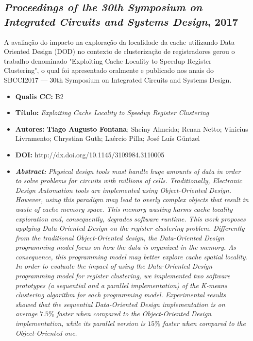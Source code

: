 \subsection{\textit{Proceedings of the 30th Symposium on Integrated Circuits and Systems Design}, 2017}

A avaliação do impacto na exploração da localidade da cache utilizando Data-Oriented Design (DOD) no contexto de clusterização de registradores gerou o trabalho denominado "Exploiting Cache Locality to Speedup Register Clustering", o qual foi apresentado oralmente e publicado nos anais do SBCCI2017 --- 30th Symposium on Integrated Circuits and Systems Design.

\begin{itemize}
\item \textbf{Qualis CC:} B2
\item \textbf{Título:} \textit{Exploiting Cache Locality to Speedup Register Clustering}
\item \textbf{Autores:}  \textbf{Tiago Augusto Fontana}; Sheiny Almeida; Renan Netto; Vinicius Livramento; Chrystian Guth;  Laércio Pilla; José Luís Güntzel
\item \textbf{DOI:} http://dx.doi.org/10.1145/3109984.3110005
\item \textbf{\textit{Abstract:}} \emph{Physical design tools must handle huge amounts of data in order to solve problems for circuits with millions of cells. Traditionally, Electronic Design Automation tools are implemented using Object-Oriented Design. However, using this paradigm may lead to overly complex objects that result in waste of cache memory space. This memory wasting harms cache locality exploration and, consequently, degrades software runtime. This work proposes applying Data-Oriented Design on the register clustering problem. Differently from the traditional Object-Oriented design, the Data-Oriented Design programming model focus on how the data is organized in the memory. As consequence, this programming model may better explore cache spatial locality. In order to evaluate the impact of using the Data-Oriented Design programming model for register clustering, we implemented two software prototypes (a sequential and a parallel implementation) of the K-means clustering algorithm for each programming model. Experimental results showed that the sequential Data-Oriented Design implementation is on average $7.5\%$ faster when compared to the Object-Oriented Design implementation, while its parallel version is $15\%$ faster when compared to the Object-Oriented one.}
\end{itemize}

